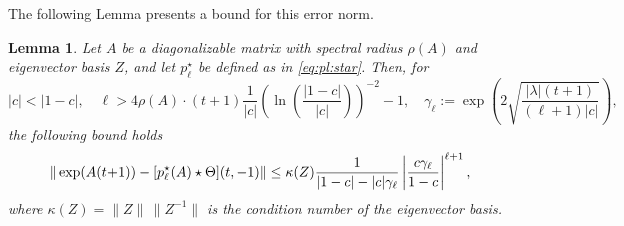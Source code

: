 \documentclass[final,1p,times,number]{elsarticle}
\theoremstyle{plain}%
\newtheorem{lem}[thm]{Lemma}
\begin{document}
The following Lemma presents a bound for this error norm. 
\begin{lem}\label{lem:bound:star} Let $A$ be a diagonalizable matrix with spectral radius $\rho(A)$ and eigenvector basis $Z$, and let $p_\ell^{\star}$ be defined as in \eqref{eq:pl:star}. Then, for 
 \[|c| < |1-c|, \quad \ell > 4\rho(A)\cdot(t+1) \frac{1}{|c|}\left(\ln\left(\frac{|1-c|}{|c|}\right)\right)^{-2} - 1, \quad \gamma_\ell :=\exp\left(2\sqrt{\frac{|\lambda|(t+1)}{(\ell+1)|c|}}\right), \]
the following bound holds
\[
      \| \exp(A(t\hspace{-2pt}+\hspace{-2pt}1)) -  [p_\ell^\star(A)\star \Theta](t,-1) \| \leq \kappa(Z)  \frac{1}{|1-c|-|c|\gamma_\ell}  \left|\frac{c \gamma_\ell}{1-c}\right|^{\ell+1}, \]
where $\kappa(Z) = \| Z \| \, \| Z^{-1}\|$ is the condition number of the eigenvector basis.
\end{lem}
\end{document}
